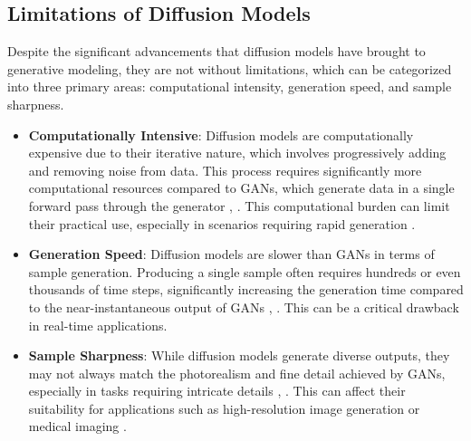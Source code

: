 \subsection{Limitations of Diffusion Models}

Despite the significant advancements that diffusion models have brought to generative modeling, they are not without limitations, which can be categorized into three primary areas: computational intensity, generation speed, and sample sharpness.

\begin{itemize}
    \item \textbf{Computationally Intensive}: Diffusion models are computationally expensive due to their iterative nature, which involves progressively adding and removing noise from data. This process requires significantly more computational resources compared to GANs, which generate data in a single forward pass through the generator \citep{10.1109/msp.2017.2765202}, \citep{10.1145/3422622}. This computational burden can limit their practical use, especially in scenarios requiring rapid generation \citep{10.48550/arxiv.2211.07804}.
    
    \item \textbf{Generation Speed}: Diffusion models are slower than GANs in terms of sample generation. Producing a single sample often requires hundreds or even thousands of time steps, significantly increasing the generation time compared to the near-instantaneous output of GANs \citep{10.48550/arxiv.2011.13456}, \citep{10.48550/arxiv.2010.02502}. This can be a critical drawback in real-time applications.
    
    \item \textbf{Sample Sharpness}: While diffusion models generate diverse outputs, they may not always match the photorealism and fine detail achieved by GANs, especially in tasks requiring intricate details \citep{10.48550/arxiv.2105.05233}, \citep{10.1109/cvpr52688.2022.01117}. This can affect their suitability for applications such as high-resolution image generation or medical imaging \citep{10.48550/arxiv.2211.07804}.
\end{itemize}
